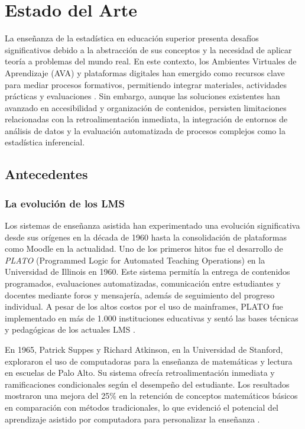 \documentclass[letter,oneside,12pt,spanish]{report}
\begin{document}
\newpage


\chapter{Estado del Arte}

La enseñanza de la estadística en educación superior presenta desafíos significativos debido a la abstracción de sus conceptos y la necesidad de aplicar teoría a problemas del mundo real. En este contexto, los Ambientes Virtuales de Aprendizaje (AVA) y plataformas digitales han emergido como recursos clave para mediar procesos formativos, permitiendo integrar materiales, actividades prácticas y evaluaciones \parencite{AlHaddad2024}. Sin embargo, aunque las soluciones existentes han avanzado en accesibilidad y organización de contenidos, persisten limitaciones relacionadas con la retroalimentación inmediata, la integración de entornos de análisis de datos y la evaluación automatizada de procesos complejos como la estadística inferencial.

\section{Antecedentes}

\subsection{La evolución de los LMS}
Los sistemas de enseñanza asistida han experimentado una evolución significativa desde sus orígenes en la década de 1960 hasta la consolidación de plataformas como Moodle en la actualidad. Uno de los primeros hitos fue el desarrollo de \textit{PLATO} (Programmed Logic for Automated Teaching Operations) en la Universidad de Illinois en 1960. Este sistema permitía la entrega de contenidos programados, evaluaciones automatizadas, comunicación entre estudiantes y docentes mediante foros y mensajería, además de seguimiento del progreso individual. A pesar de los altos costos por el uso de mainframes, PLATO fue implementado en más de 1.000 instituciones educativas y sentó las bases técnicas y pedagógicas de los actuales LMS \parencite{Woolley2016}.

En 1965, Patrick Suppes y Richard Atkinson, en la Universidad de Stanford, exploraron el uso de computadoras para la enseñanza de matemáticas y lectura en escuelas de Palo Alto. Su sistema ofrecía retroalimentación inmediata y ramificaciones condicionales según el desempeño del estudiante. Los resultados mostraron una mejora del 25\% en la retención de conceptos matemáticos básicos en comparación con métodos tradicionales, lo que evidenció el potencial del aprendizaje asistido por computadora para personalizar la enseñanza \parencite{Suppes1966}.
\end{document}
